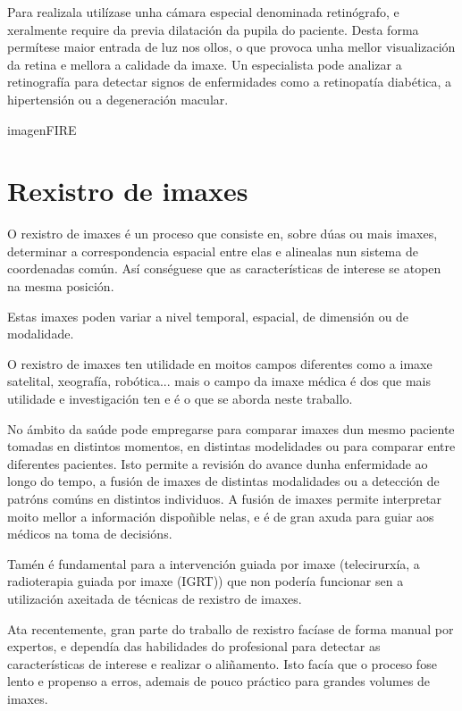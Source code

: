 Para realizala utilízase unha cámara especial denominada retinógrafo, e xeralmente require da previa dilatación da pupila do paciente.
Desta forma permítese maior entrada de luz nos ollos, o que provoca unha mellor visualización da retina e mellora a calidade da imaxe.
Un especialista pode analizar a retinografía para detectar signos de enfermidades como a retinopatía diabética, a hipertensión ou a degeneración macular.

imagenFIRE

\section{Rexistro de imaxes}
\label{sec:Rexistro de imaxes}
O rexistro de imaxes é un proceso que consiste en, sobre dúas ou mais imaxes, determinar a correspondencia espacial entre elas e alinealas nun sistema de coordenadas común.
Así conséguese que as características de interese se atopen na mesma posición.

Estas imaxes poden variar a nivel temporal, espacial, de dimensión ou de modalidade.

O rexistro de imaxes ten utilidade en moitos campos diferentes como a imaxe satelital, xeografía, robótica... \cite{goshtasby2017theory} mais o 
campo da imaxe médica é dos que mais utilidade e investigación ten e é o que se aborda neste traballo.

No ámbito da saúde pode empregarse para comparar imaxes dun mesmo paciente tomadas en distintos momentos, en distintas modelidades ou para comparar entre diferentes pacientes.
Isto permite a revisión do avance dunha enfermidade ao longo do tempo, a fusión de imaxes de distintas modalidades ou a detección de patróns comúns en distintos individuos.
A fusión de imaxes permite interpretar moito mellor a información dispoñible nelas, e é de gran axuda para guiar aos médicos na toma de decisións.

Tamén é fundamental para a intervención guiada por imaxe (telecirurxía, a radioterapia guiada por imaxe (IGRT)) que non 
podería funcionar sen a utilización axeitada de técnicas de rexistro de imaxes.


Ata recentemente, gran parte do traballo de rexistro facíase de forma manual por expertos, 
e dependía das habilidades do profesional para detectar as características de interese e realizar o aliñamento.
Isto facía que o proceso fose lento e propenso a erros, ademais de pouco práctico para grandes volumes de imaxes.


